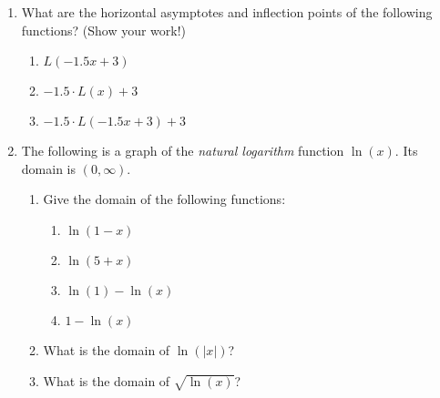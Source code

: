 \documentclass{article}
\begin{document}
\begin{enumerate}
\item What are the horizontal asymptotes and inflection points of the following functions? (Show your work!)
  \begin{enumerate}
  \item $L(-1.5 x + 3)$
    \vspace{1.5in}
  \item $-1.5 \cdot L(x) + 3$
    \vspace{1.5in}
  \item $-1.5 \cdot L( -1.5 x + 3) + 3$
  \end{enumerate}
\pagebreak
\item The following is a graph of the \emph{natural logarithm} function $\ln(x)$. Its domain is $(0,\infty)$.
  \begin{center}
\end{center}
\begin{enumerate}
\item Give the domain of the following functions:
  \begin{multicols}{2}
  \begin{enumerate}
  \item $\ln(1-x)$
    \vspace{1in}
  \item $\ln(5 + x)$
    \vspace{1in}
  \item $\ln(1) - \ln(x)$
    \vspace{1in}
  \item $1 - \ln(x)$
  \end{enumerate}
\end{multicols}
\vspace{1in}

\item What is the domain of $\ln(|x|)$?
  \vspace{1in}
\item What is the domain of $\sqrt{\ln(x)}$?
\end{enumerate}

\end{enumerate}
\end{document}
